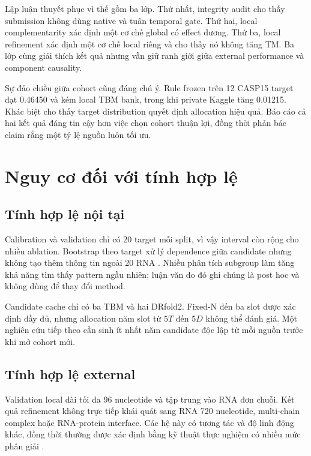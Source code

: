 \documentclass[12pt,a4paper,oneside]{report}
\begin{document}
Lập luận thuyết phục vì thế gồm ba lớp. Thứ nhất, integrity audit cho thấy submission
không dùng native và tuân temporal gate. Thứ hai, local complementarity xác định một
cơ chế global có effect dương. Thứ ba, local refinement xác định một cơ chế local riêng
và cho thấy nó không tăng TM. Ba lớp cùng giải thích kết quả nhưng vẫn giữ ranh giới giữa
external performance và component causality.

Sự đảo chiều giữa cohort cũng đáng chú ý. Rule frozen trên 12 CASP15 target đạt 0.46450
và kém local TBM bank, trong khi private Kaggle tăng 0.01215. Khác biệt cho thấy target
distribution quyết định allocation hiệu quả. Báo cáo cả hai kết quả đáng tin cậy hơn
việc chọn cohort thuận lợi, đồng thời phản bác claim rằng một tỷ lệ nguồn luôn tối ưu.

\section{Nguy cơ đối với tính hợp lệ}

\subsection{Tính hợp lệ nội tại}

Calibration và validation chỉ có 20 target mỗi split, vì vậy interval còn rộng cho nhiều
ablation. Bootstrap theo target xử lý dependence giữa candidate nhưng không tạo thêm
thông tin ngoài 20 RNA \cite{bootstrap}. Nhiều phân tích subgroup làm tăng khả năng tìm
thấy pattern ngẫu nhiên; luận văn do đó ghi chúng là post hoc và không dùng để thay đổi
method.

Candidate cache chỉ có ba TBM và hai DRfold2. Fixed-N đến ba slot được xác định đầy đủ,
nhưng allocation năm slot từ $5T$ đến $5D$ không thể đánh giá. Một nghiên cứu tiếp theo
cần sinh ít nhất năm candidate độc lập từ mỗi nguồn trước khi mở cohort mới.

\subsection{Tính hợp lệ external}

Validation local dài tối đa 96 nucleotide và tập trung vào RNA đơn chuỗi. Kết quả
refinement không trực tiếp khái quát sang RNA 720 nucleotide, multi-chain complex hoặc
RNA-protein interface. Các hệ này có tương tác và độ linh động khác, đồng thời thường
được xác định bằng kỹ thuật thực nghiệm có nhiều mức phân giải
\cite{zhang_experimental_review,ma_cryoem}.
\end{document}
